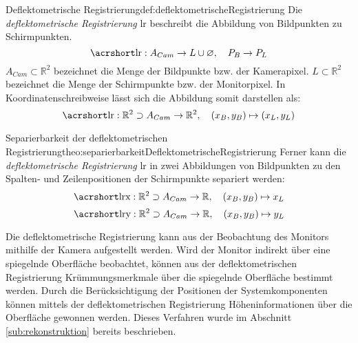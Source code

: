 \begin{Definition}{Deflektometrische Registrierung}{def:deflektometrischeRegistrierung}
	Die \textit{deflektometrische Registrierung} \acrshort{lr} beschreibt die Abbildung von Bildpunkten zu Schirmpunkten. \cite{kit_werling}
	\begin{equation*}
		\acrshortmath{lr} : A_{Cam} \rightarrow L \cup \varnothing ,\quad P_{B} \rightarrow P_{L}
	\end{equation*}
	$ A_{Cam} \subset \mathbb{R}^{2} $ bezeichnet die Menge der Bildpunkte bzw. der Kamerapixel.
	$ L \subset \mathbb{R}^{2} $ bezeichnet die Menge der Schirmpunkte bzw. der Monitorpixel.
	In Koordinatenschreibweise lässt sich die Abbildung somit darstellen als:
	\begin{equation*}\label{eq:deflektometrischeRegistrierungAbbildung}
		\acrshortmath{lr} : \mathbb{R}^{2} \supset A_{Cam} \rightarrow \mathbb{R}^2 ,\quad (x_{B}, y_{B}) \mapsto (x_{L}, y_{L})
	\end{equation*}
\end{Definition}

\begin{Satz}{Separierbarkeit der deflektometrischen Registrierung}{theo:separierbarkeitDeflektometrischeRegistrierung}
Ferner kann die \textit{deflektometrische Registrierung} \acrshort{lr} in zwei Abbildungen von Bildpunkten zu den Spalten- und Zeilenpositionen der Schirmpunkte separiert werden:
	\begin{equation*}
		\acrshortmath{lrx} : \mathbb{R}^{2} \supset A_{Cam} \rightarrow \mathbb{R} ,\quad (x_{B}, y_{B}) \mapsto x_{L}
	\end{equation*}
	\begin{equation*}
		\acrshortmath{lry} : \mathbb{R}^{2} \supset A_{Cam} \rightarrow \mathbb{R} ,\quad (x_{B}, y_{B}) \mapsto y_{L}
	\end{equation*}
\end{Satz}

\noindent
Die deflektometrische Registrierung kann aus der Beobachtung des Monitors mithilfe der Kamera aufgestellt werden.
Wird der Monitor indirekt über eine spiegelnde Oberfläche beobachtet, können aus der deflektometrischen Registrierung Krümmungsmerkmale über die spiegelnde Oberfläche bestimmt werden.
Durch die Berücksichtigung der Positionen der Systemkomponenten können mittels der deflektometrischen Registrierung Höheninformationen über die Oberfläche gewonnen werden.
Dieses Verfahren wurde im Abschnitt \ref{sub:rekonstruktion} bereits beschrieben.

